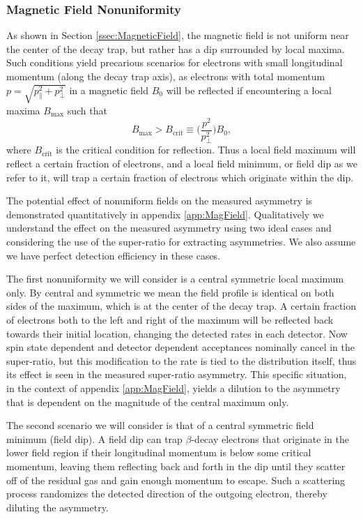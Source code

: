 \subsubsection{Magnetic Field Nonuniformity} \label{sssec:MagFieldSyst}

As shown in Section \ref{ssec:MagneticField}, the magnetic field is not uniform
near the center of the decay trap, but rather has a dip surrounded by local maxima.
Such conditions yield precarious scenarios for electrons with small longitudinal momentum
(along the decay trap axis), as electrons with total momentum $p=\sqrt{p_\parallel^2 + p_\perp^2}$
in a magnetic field $B_0$ will be reflected if encountering a local maxima $B_{\mathrm{max}}$ such that
\begin{equation}
  B_{\mathrm{max}} > B_{\mathrm{crit}} \equiv \Big( \frac{p^2}{p_\perp^2} \Big) B_0,
\end{equation}
\noindent where $B_{\mathrm{crit}}$ is the critical condition for reflection. Thus a local field maximum
will reflect a certain fraction of electrons, and a local field minimum, or field dip as
we refer to it, will trap a certain fraction
of electrons which originate within the dip.

The potential effect of nonuniform fields on the measured asymmetry is demonstrated
quantitatively in appendix \ref{app:MagField}. Qualitatively we understand the effect on the
measured asymmetry using two ideal cases and considering the use
of the super-ratio for extracting asymmetries. We also assume we have perfect detection
efficiency in these cases.

The first nonuniformity we will consider
is a central symmetric local maximum only. By central and symmetric we mean the field profile is
identical on both sides of the maximum, which is at the center of the decay trap.
A certain fraction of electrons both to
the left and right of the maximum will be reflected back towards their initial location,
changing the detected rates in each detector. Now spin state dependent and detector dependent
acceptances nominally cancel in the super-ratio, but this modification to the rate is tied
to the distribution itself, thus its effect is seen in the measured super-ratio asymmetry.
This specific situation, in the context of appendix \ref{app:MagField}, yields a dilution
to the asymmetry that is dependent on the magnitude of the central maximum only.

The second scenario we will consider is that of a central symmetric field minimum (field dip).
A field dip can trap $\beta$-decay electrons
that originate in the lower field region if their longitudinal momentum is
below some critical momentum, leaving them reflecting back and forth in the dip until
they scatter off of the residual gas and gain enough momentum to escape. Such a scattering
process randomizes the detected direction of the outgoing electron, thereby diluting the
asymmetry.

